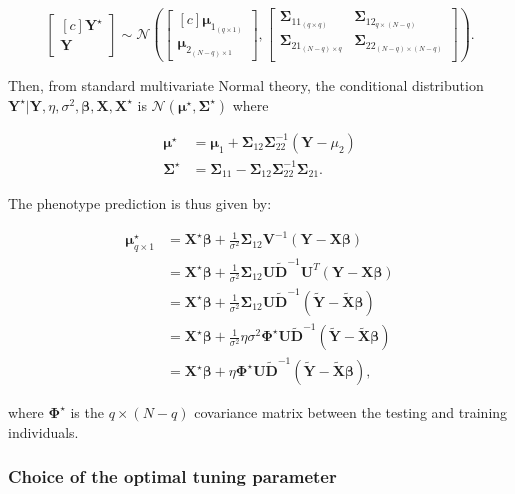 \documentclass[10pt,letterpaper]{article}
\newcommand{\bX}{\textbf{X}}
\newcommand{\bY}{\textbf{Y}}
\newcommand{\bD}{\textbf{D}}
\newcommand{\bXtilde}{\widetilde{\bX}}
\newcommand{\bYtilde}{\widetilde{\bY}}
\newcommand{\bDtilde}{\widetilde{\bD}}
\newcommand{\bU}{\textbf{U}}
\newcommand{\bV}{\textbf{V}}
\newcommand{\bSigma}{\boldsymbol{\Sigma}}
\newcommand{\bmu}{\boldsymbol{\mu}}
\newcommand{\bbeta}{\boldsymbol{\beta}}
\newcommand{\bPhi}{\boldsymbol{\Phi}}
\begin{document}
\begin{equation*}
\left[ \begin{matrix*}[c]
\bY^\star \\
\bY
\end{matrix*}\right] \sim \mathcal{N} \left( \left[\begin{matrix*}[c]
\bmu_{1_{(q\times 1)}} \\
\bmu_{2_{(N-q)\times 1}}
\end{matrix*}\right], \left[ \begin{matrix}
\bSigma_{11_{(q\times q)}} & \bSigma_{12_{q\times (N-q)}} \\
\bSigma_{21_{(N-q)\times q}} & \bSigma_{22_{(N-q)\times (N-q)}}  \\
\end{matrix}   \right]  \right).
\end{equation*}


Then, from standard multivariate Normal theory, the conditional distribution $\bY^\star | \bY, \eta, \sigma^2, \bbeta,\bX, \bX^\star$ is $\mathcal{N}(\bmu^\star, \bSigma^\star)$ where

\begin{align*}
\bmu^\star &= \bmu_1 + \bSigma_{12} \bSigma_{22}^{-1} (\bY - \mu_2) \\
\bSigma^\star & = \bSigma_{11} - \bSigma_{12} \bSigma_{22}^{-1} \bSigma_{21}.
\end{align*}

The phenotype prediction is thus given by:

\begin{align*}
\bmu^\star_{q \times 1} & = \bX^\star \bbeta + \frac{1}{\sigma^2} \bSigma_{12} \bV^{-1} (\bY - \bX \bbeta)\\
& = \bX^\star \bbeta + \frac{1}{\sigma^2} \bSigma_{12} \bU \bDtilde^{-1} \bU^T (\bY - \bX \bbeta)\\
& = \bX^\star \bbeta + \frac{1}{\sigma^2} \bSigma_{12} \bU \bDtilde^{-1} (\bYtilde - \bXtilde \bbeta ) \\
& = \bX^\star \bbeta + \frac{1}{\sigma^2} \eta \sigma^2 \bPhi^\star \bU \bDtilde^{-1} (\bYtilde - \bXtilde \bbeta ) \\
& = \bX^\star \bbeta +  \eta  \bPhi^\star \bU \bDtilde^{-1} (\bYtilde - \bXtilde \bbeta ),
\end{align*}

where $\bPhi^\star$ is the $q \times (N-q)$ covariance matrix between the testing and training individuals.



\subsubsection*{Choice of the optimal tuning parameter} \label{subsubsec:gic}
\end{document}

